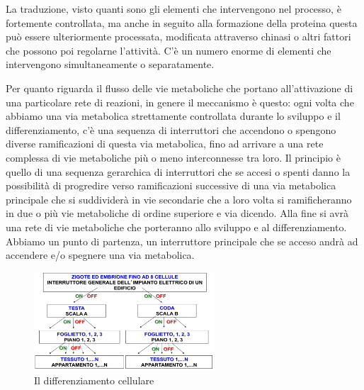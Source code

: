 \documentclass[11pt]{book}
\begin{document}
La traduzione, visto quanti sono gli elementi che intervengono nel processo, è fortemente controllata, ma anche in seguito alla formazione della proteina questa può essere ulteriormente processata, modificata attraverso chinasi o altri fattori che possono poi regolarne l’attività. C’è un numero enorme di elementi che intervengono simultaneamente o separatamente.

Per quanto riguarda il flusso delle vie metaboliche che portano all’attivazione di una particolare rete di reazioni, in genere il meccanismo è questo: ogni volta che abbiamo una via metabolica strettamente controllata durante lo sviluppo e il differenziamento, c’è una sequenza di interruttori che accendono o spengono diverse ramificazioni di questa via metabolica, fino ad arrivare a una rete complessa di vie metaboliche più o meno interconnesse tra loro. Il principio è quello di una sequenza gerarchica di interruttori che se accesi o spenti danno la possibilità di progredire verso ramificazioni successive di una via metabolica principale che si suddividerà in vie secondarie che a loro volta si ramificheranno in due o più vie metaboliche di ordine superiore e via dicendo. Alla fine si avrà una rete di vie metaboliche che porteranno allo sviluppo e al differenziamento. Abbiamo un punto di partenza, un interruttore principale che se acceso andrà ad accendere e/o spegnere una via metabolica.

\begin{figure}
    \includegraphics[width=0.6\textwidth]{img/impianto_elettrico.png}
  \caption{Il differenziamento cellulare}
\end{figure}
\end{document}
